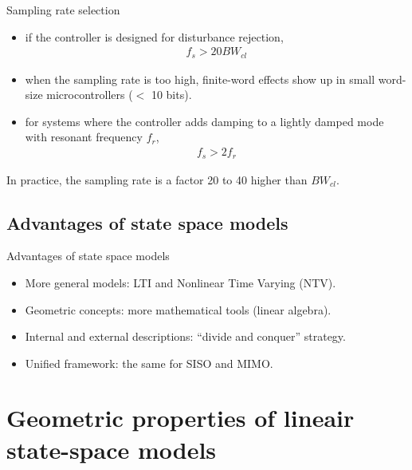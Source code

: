 \begin{frame}{Sampling rate selection}  
\begin{itemize}
     \item if the controller is designed for disturbance rejection,
            \begin{align*}
            f_s>20BW_{cl}
            \end{align*}
     \item when the sampling rate is too high, finite-word effects
show up in small word-size microcontrollers ($<$ 10 bits).

     \item for systems where the controller adds damping to a
lightly damped mode with resonant frequency $f_r$, \vspace{-0.2cm}
             \begin{align*}
              f_s>2f_r
            \end{align*}
\end{itemize}
\vspace{-0.3cm}
In practice, the sampling rate is a factor 20 to 40 higher
than $BW_{cl}$.

\end{frame}

\subsection{Advantages of state space models}
\begin{frame}{Advantages of state space models}  
\begin{itemize}
    \item More general models: LTI and Nonlinear Time Varying (NTV).
    \item Geometric concepts: more mathematical tools (linear
algebra).
    \item Internal and external descriptions: “divide and conquer”
strategy.

    \item Unified framework: the same for SISO and MIMO.
\end{itemize}
\end{frame}

\section{Geometric properties of lineair state-space models}

